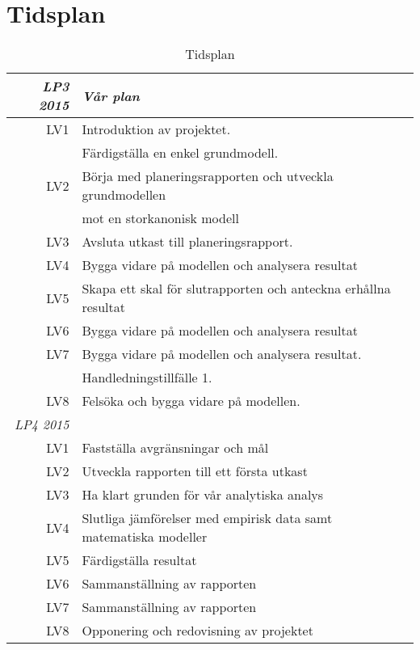 \section{Tidsplan}


\begin{center}
\begin{table}[h!]

\begin{tabular}{| r| l| } \hline


 \emph{LP3 2015} & \emph{Vår plan} \\ \hline
  LV1 & Introduktion av projektet. \\& Färdigställa en enkel grundmodell.  \\ \hline
  LV2 & Börja med planeringsrapporten och utveckla grundmodellen \\& mot en storkanonisk modell \\ \hline
  LV3 & Avsluta utkast till planeringsrapport.\\ \hline
  LV4 & Bygga vidare på modellen och analysera resultat \\ \hline
  LV5 & Skapa ett skal för slutrapporten och anteckna erhållna resultat \\ \hline
  LV6 & Bygga vidare på modellen och analysera resultat \\ \hline
  LV7 & Bygga vidare på modellen och analysera resultat. \\& Handledningstillfälle 1. \\ \hline
  LV8 & Felsöka och bygga vidare på modellen. \\ \hline
  \emph{LP4 2015} &  \\ \hline
  LV1 & Fastställa avgränsningar och mål \\ \hline
  LV2 & Utveckla rapporten till ett första utkast \\ \hline
  LV3 & Ha klart grunden för vår analytiska analys \\ \hline
  LV4 & Slutliga jämförelser med empirisk data samt matematiska modeller \\ \hline
  LV5 & Färdigställa resultat \\ \hline
  LV6 & Sammanställning av rapporten \\ \hline  
  LV7 & Sammanställning av rapporten \\ \hline  
  LV8 & Opponering och redovisning av projektet \\ \hline
\end{tabular}
\caption*{Tidsplan}
\label{tidsplan}
\end{table}
\end{center} 
